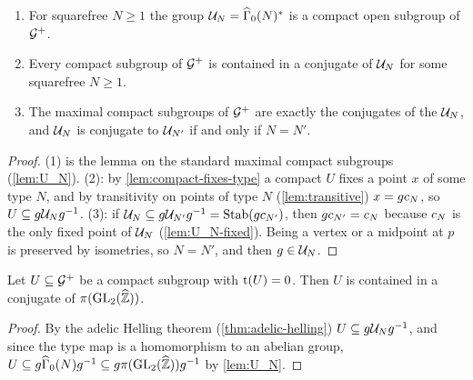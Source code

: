 \begin{theorem}\label{thm:adelic-helling}
\begin{enumerate}
\item For squarefree $N \geq 1$ the group $\MaxCompact{N} =
  \GammaZeroStar[ad]{N}$ is a compact open subgroup of $\mathcal{G}^{+}$.
\item Every compact subgroup of $\mathcal{G}^{+}$ is contained in a conjugate
  of $\mathcal{U}_{N}$ for some squarefree $N \geq 1$.
\item The maximal compact subgroups of $\mathcal{G}^{+}$ are exactly the
  conjugates of the $\mathcal{U}_{N}$, and $\mathcal{U}_{N}$ is conjugate to
  $\mathcal{U}_{N'}$ if and only if $N = N'$.
\end{enumerate}
\end{theorem}

\begin{proof}
(1) is the lemma on the standard maximal compact subgroups
(\cref{lem:U_N}). (2): by \cref{lem:compact-fixes-type} a compact $U$ fixes
a point $x$ of some type $N$, and by transitivity on points of type $N$
(\cref{lem:transitive}) $x = gc_{N}$, so $U \subseteq
g\mathcal{U}_{N}g^{-1}$. (3): if $\mathcal{U}_{N} \subseteq g\mathcal{U}_{N'}g^{-1}
= \operatorname{Stab}(gc_{N'})$, then $gc_{N'} = c_{N}$ because
$c_{N}$ is the only fixed point of $\mathcal{U}_{N}$
(\cref{lem:U_N-fixed}). Being a vertex or a midpoint at $p$ is preserved
by isometries, so $N = N'$, and then $g \in \mathcal{U}_{N}$.
\end{proof}

\begin{corollary}
\label{cor:type-trivial-in-glzhat}
Let $U \subseteq \mathcal{G}^{+}$ be a compact subgroup with $\mathrm{t}(U) = 0$.
Then $U$ is contained in a conjugate of
$\AdelicProjection(\GL{2}{\ProfiniteIntegers})$.
\end{corollary}

\begin{proof}
By the adelic Helling theorem (\cref{thm:adelic-helling}) $U \subseteq
g\mathcal{U}_{N}g^{-1}$, and since the type map is a homomorphism to an
abelian group, $U \subseteq g\GammaZero[ad]{N}g^{-1} \subseteq
g\AdelicProjection(\GL{2}{\ProfiniteIntegers})g^{-1}$ by \cref{lem:U_N}.
\end{proof}

